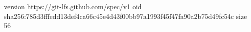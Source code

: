 version https://git-lfs.github.com/spec/v1
oid sha256:785d3fffedd13def4ca66c45e4d43f00bb97a1993f45f47fa90a2b75d49fc54c
size 56
